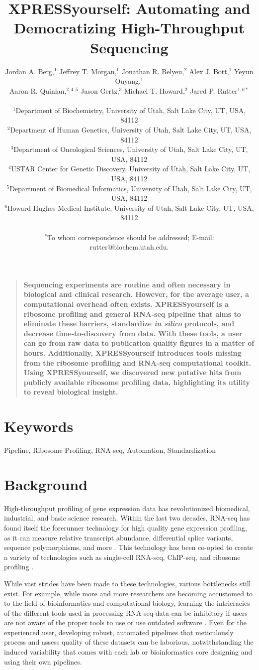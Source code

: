 \documentclass[11pt, a4paper, oneside]{article}
\title{
XPRESSyourself: Automating and Democratizing High-Throughput Sequencing
}
\author{
Jordan A. Berg,$^{1}$ Jeffrey T. Morgan,$^{1}$ Jonathan R. Belyeu,$^{2}$ Alex J. Bott,$^{1}$ Yeyun Ouyang,$^{1}$\\
Aaron R. Quinlan,$^{2,4,5}$ Jason Gertz,$^{3}$ Michael T. Howard,$^{2}$ Jared P. Rutter$^{1,6\ast}$\\
\\
\normalsize{$^{1}$Department of Biochemistry, University of Utah, Salt Lake City, UT, USA, 84112}\\
\normalsize{$^{2}$Department of Human Genetics, University of Utah, Salt Lake City, UT, USA, 84112}\\
\normalsize{$^{3}$Department of Oncological Sciences, University of Utah, Salt Lake City, UT, USA, 84112}\\
\normalsize{$^{4}$USTAR Center for Genetic Discovery, University of Utah, Salt Lake City, UT, USA, 84112}\\
\normalsize{$^{5}$Department of Biomedical Informatics, University of Utah, Salt Lake City, UT, USA, 84112}\\
\normalsize{$^{6}$Howard Hughes Medical Institute, University of Utah, Salt Lake City, UT, USA, 84112}\\
\\
\normalsize{$^\ast$To whom correspondence should be addressed; E-mail: rutter@biochem.utah.edu.}
}
\date{}
\newenvironment{sciabstract}{%
\begin{quote} \bf}
{\end{quote}}
\begin{document}
\baselineskip24pt

\maketitle



\begin{sciabstract}
Sequencing experiments are routine and often necessary in biological and clinical research. However, for the average user, a computational overhead often exists. XPRESSyourself is a ribosome profiling and general RNA-seq pipeline that aims to eliminate these barriers, standardize \textit{in silico} protocols, and decrease time-to-discovery from data. With these tools, a user can go from raw data to publication quality figures in a matter of hours. Additionally, XPRESSyourself introduces tools missing from the ribosome profiling and RNA-seq computational toolkit. Using XPRESSyourself, we discovered new putative hits from publicly available ribosome profiling data, highlighting its utility to reveal biological insight.
\end{sciabstract}

\section*{Keywords}
Pipeline, Ribosome Profiling, RNA-seq, Automation, Standardization

\section{Background}
High-throughput profiling of gene expression data has revolutionized biomedical, industrial, and basic science research. Within the last two decades, RNA-seq has found itself the forerunner technology for high quality gene expression profiling, as it can measure relative transcript abundance, differential splice variants, sequence polymorphisms, and more \cite{byron_nrg}. This technology has been co-opted to create a variety of technologies such as single-cell RNA-seq, ChIP-seq, and ribosome profiling \cite{ingolia_science}.

While vast strides have been made to these technologies, various bottlenecks still exist. For example, while more and more researchers are becoming accustomed to to the field of bioinformatics and computational biology, learning the intricracies of the different tools used in processing RNA-seq data can be inhibitory if users are not aware of the proper tools to use or use outdated software \cite{costello_npjsba, funari_science}. Even for the experienced user, developing robust, automated pipelines that meticulously process and assess quality of these datasets can be laborious, notwithstanding the induced variability that comes with each lab or bioinformatics core designing and using their own pipelines.
\end{document}
